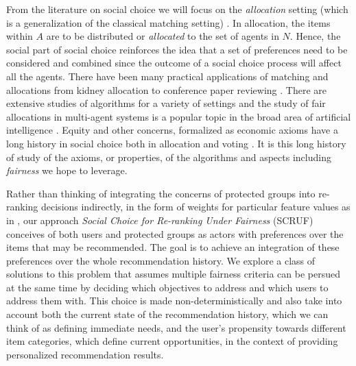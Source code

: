 From the literature on social choice we will focus on the \emph{allocation} setting (which is a generalization of the classical matching setting) \cite{BCELP16a}. In allocation, the items within $A$ are to be distributed or \emph{allocated} to the set of agents in $N$.  Hence, the social part of social choice reinforces the idea that a set of preferences need to be considered and combined since the outcome of a social choice process will affect all the agents.  There have been many practical applications of matching and allocations from kidney allocation \cite{Roth:Kidney} to conference paper reviewing \cite{LiMaNoWa18}.  There are extensive studies of algorithms for a variety of settings \cite{Manlove:MatchingPrefs} and the study of fair allocations in multi-agent systems is a popular topic in the broad area of artificial intelligence \cite{Aziz:FairAllocation}. Equity and other concerns, formalized as economic axioms have a long history in social choice both in allocation \cite{Young:Equity} and voting \cite{Zwicker:Voting}. It is this long history of study of the axioms, or properties, of the algorithms and aspects including \emph{fairness} we hope to leverage.

Rather than thinking of integrating the concerns of protected groups into re-ranking decisions indirectly, in the form of weights for particular feature values as in \cite{sonboli-umap-2020}, our approach \textit{Social Choice for Re-ranking Under Fairness} (SCRUF) conceives of both users and protected groups as actors with preferences over the items that may be recommended. The goal is to achieve an integration of these preferences over the whole recommendation history. We explore a class of solutions to this problem that assumes multiple fairness criteria can be persued at the same time by deciding which objectives to address and which users to address them with.  This choice is made non-deterministically and also take into account both the current state of the recommendation history, which we can think of as defining immediate needs, and the user's propensity towards different item categories, which define current opportunities, in the context of providing personalized recommendation results. 

